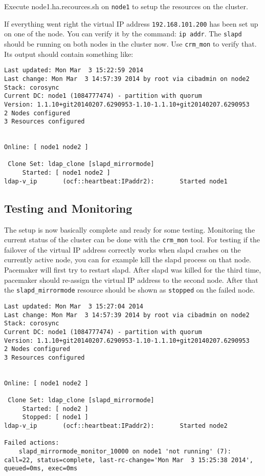 \documentclass[a4paper,11pt,DIV=12]{scrartcl}
\begin{document}
    Execute node1.ha.recources.sh on \verb|node1| to setup the resources on the cluster.

    If everything went right the virtual IP address \verb|192.168.101.200| has
    been set up on one of the node. You can verify it by the command: \verb|ip addr|.
    The \verb|slapd| should be running on both nodes in the cluster now.
    Use \verb|crm_mon| to verify that. Its output should contain something like:
    \begin{verbatim}
Last updated: Mon Mar  3 15:22:59 2014
Last change: Mon Mar  3 14:57:39 2014 by root via cibadmin on node2
Stack: corosync
Current DC: node1 (1084777474) - partition with quorum
Version: 1.1.10+git20140207.6290953-1.10-1.1.10+git20140207.6290953
2 Nodes configured
3 Resources configured


Online: [ node1 node2 ]

 Clone Set: ldap_clone [slapd_mirrormode]
     Started: [ node1 node2 ]
ldap-v_ip       (ocf::heartbeat:IPaddr2):       Started node1
    \end{verbatim}


\subsection{Testing and Monitoring}
    The setup is now basically complete and ready for some testing. Monitoring
    the current status of the cluster can be done with the \verb|crm_mon| tool.
    For testing if the failover of the virtual IP address correctly works when
    slapd crashes on the currently active node, you can for example kill the
    slapd process on that node. Pacemaker will first try to
    restart slapd. After slapd was killed for the third time, pacemaker should
    re-assign the virtual IP address to the second node. After that the
    \verb|slapd_mirrormode| resource should be shown as \verb|stopped| on the
    failed node.

    \begin{verbatim}
Last updated: Mon Mar  3 15:27:04 2014
Last change: Mon Mar  3 14:57:39 2014 by root via cibadmin on node2
Stack: corosync
Current DC: node1 (1084777474) - partition with quorum
Version: 1.1.10+git20140207.6290953-1.10-1.1.10+git20140207.6290953
2 Nodes configured
3 Resources configured


Online: [ node1 node2 ]

 Clone Set: ldap_clone [slapd_mirrormode]
     Started: [ node2 ]
     Stopped: [ node1 ]
ldap-v_ip       (ocf::heartbeat:IPaddr2):       Started node2

Failed actions:
    slapd_mirrormode_monitor_10000 on node1 'not running' (7): call=22, status=complete, last-rc-change='Mon Mar  3 15:25:38 2014', queued=0ms, exec=0ms
    \end{verbatim}
\end{document}
